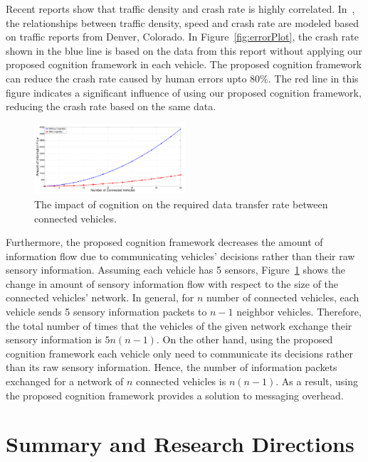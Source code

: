 \documentclass[journal, 11pt]{IEEEtran}
\begin{document}
Recent reports show that traffic density and crash rate is highly correlated.
In~\cite{trb12}, the relationships between traffic density, speed and crash rate
are modeled based on traffic reports from Denver, Colorado. In
Figure~\ref{fig:errorPlot}, the crash rate shown in the blue line is based on
the data from this report without applying our proposed cognition framework in
each vehicle. The proposed cognition framework can reduce the crash rate caused
by human errors upto $80\%$. The red line in this figure indicates a significant
influence of using our proposed cognition framework, reducing the crash rate
based on the same data.

\begin{figure}[tbh]
  \centering
  \includegraphics[width=0.5\textwidth]{figs/infoFlow.pdf}
  \caption{{\fontsize{10}{10}\selectfont The impact of cognition on the required
  data transfer rate between connected vehicles.}}
  \label{fig:infoFlow}
  \vspace*{-6mm}
\end{figure}

Furthermore, the proposed cognition framework decreases the amount of
information flow due to communicating vehicles' decisions rather than their raw
sensory information. Assuming each vehicle has 5 sensors,
Figure~\ref{fig:infoFlow} shows the change in amount of sensory information flow
with respect to the size of the connected vehicles' network. In general, for $n$
number of connected vehicles, each vehicle sends 5 sensory information packets
to $n - 1$ neighbor vehicles. Therefore, the total number of times that the
vehicles of the given network exchange their sensory information is $5n(n-1)$.
On the other hand, using the proposed cognition framework each vehicle only
need to communicate its decisions rather than its raw sensory information.
Hence, the number of information packets exchanged for a network of $n$
connected vehicles is $n(n-1)$. As a result, using the proposed cognition
framework provides a solution to messaging overhead.

\section{Summary and Research Directions}
\label{Sec:Conc}
\end{document}
